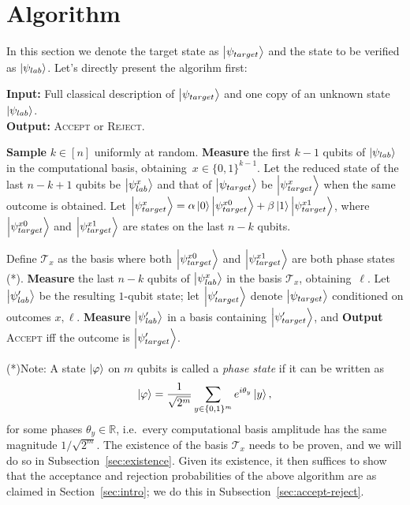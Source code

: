 \section{Algorithm}\label{sec:algorithm}
In this section we denote the target state as $\ket{\psi_{target}}$
and the state to be verified as $\ket{\psi_{lab}}$. 
Let's directly present the algorihm first:

\begin{algorithm}[H]
    \vspace{0.3em}
    \textbf{Input:} Full classical description of $\ket{\psi_{target}}$ 
    and one copy of an unknown state $\ket{\psi_{lab}}$. \\
    \textbf{Output:} \textsc{Accept} or \textsc{Reject}.
    \begin{algorithmic}[1]
    \State \textbf{Sample} $k\in[n]$ uniformly at random.
    \State \textbf{Measure} the first $k-1$ qubits of $\ket{\psi_{lab}}$ 
    in the computational basis, obtaining~$x\in\{0,1\}^{k-1}$. 
    Let the reduced state of the last $n-k+1$ qubits be $\ket{\psi_{lab}^x}$ and 
    that of $\ket{\psi_{target}}$ be $\ket{\psi_{target}^x}$ when the same outcome is obtained.
    \State Let $\ket{\psi_{target}^x} = \alpha\ket{0}\ket{\psi_{target}^{x0}} + \beta\ket{1}\ket{\psi_{target}^{x1}}$, 
    where $\ket{\psi_{target}^{x0}}$ and $\ket{\psi_{target}^{x1}}$ are states on the last $n-k$ qubits.
    
    \noindent Define $\mathcal{T}_x$ as the basis where both $\ket{\psi_{target}^{x0}}$ and $\ket{\psi_{target}^{x1}}$ are both 
    phase states (*). 
    \textbf{Measure} the last $n-k$ qubits of $\ket{\psi_{lab}^x}$ 
    in the basis $\mathcal{T}_x$, obtaining~$\ell$.
    \State Let $\ket{\psi_{lab}'}$ be the resulting $1$-qubit state; 
    let $\ket{\psi_{target}'}$ denote $\ket{\psi_{target}}$ conditioned on outcomes $x, \ell$.
    \noindent \textbf{Measure} $\ket{\psi_{lab}'}$ in a basis containing $\ket{\psi_{target}'}$,
    and \textbf{Output} \textsc{Accept} iff the outcome is $\ket{\psi_{target}'}$.
    \end{algorithmic}
    \caption{\textsc{Certify}$(\ket{\psi_{lab}}, \ket{\psi_{target}})$}\label{alg:main}
\end{algorithm}

(*)Note: A state $\ket{\varphi}$ on $m$ qubits is called a \emph{phase state} if it can be written as
\[
    \ket{\varphi} = \frac{1}{\sqrt{2^m}} \sum_{y \in \{0,1\}^m} e^{i\theta_y} \ket{y},
\]
for some phases $\theta_y \in \mathbb{R}$, i.e.\ every computational basis amplitude has the same magnitude $1/\sqrt{2^m}$.
The existence of the basis $\mathcal{T}_x$ needs to be proven, and we will do so in Subsection~\ref{sec:existence}. 
Given its existence, it then suffices to show that the acceptance and rejection probabilities of the above algorithm are as claimed in Section~\ref{sec:intro}; we do this in Subsection~\ref{sec:accept-reject}.


